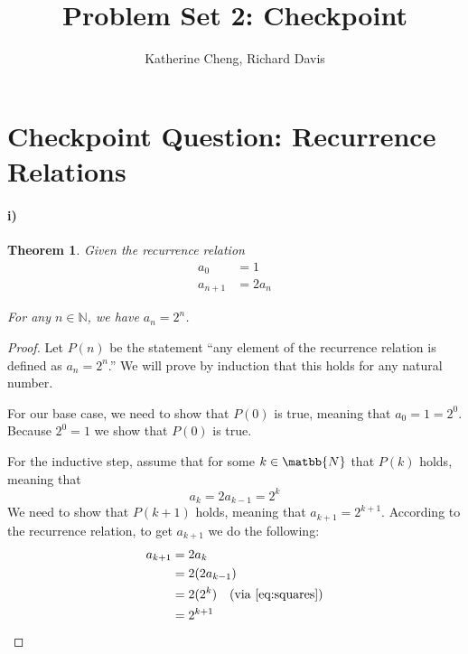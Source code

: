 \documentclass[10pt,letter]{article}
\newtheorem*{thm}{Theorem}
\begin{document}

\title{Problem Set 2: Checkpoint}

\author{Katherine Cheng, Richard Davis}

 
\maketitle 


\section*{Checkpoint Question: Recurrence Relations}

\paragraph{i)} 

\begin{thm}
  Given the recurrence relation
  \begin{align*}
    a_0 &= 1\\
    a_{n+1} &= 2a_n
  \end{align*}

  For any $n \in \mathbb{N}$, we have $a_n = 2^n$.
\end{thm}

\begin{proof}
  Let $P(n)$ be the statement ``any element of the recurrence relation is defined as $a_n = 2^n$.'' We will prove by induction that this holds for any natural number.

  For our base case, we need to show that $P(0)$ is true, meaning that $a_0 = 1 = 2^0$. Because $2^0 = 1$ we show that $P(0)$ is true.

  For the inductive step, assume that for some $k \in \matbb{N}$ that $P(k)$ holds, meaning that
  \begin{equation} \label{eq:squares}
    a_{k} = 2a_{k-1} = 2^k
  \end{equation}
  We need to show that $P(k+1)$ holds, meaning that $a_{k+1} = 2^{k+1}$. According to the recurrence relation, to get $a_{k+1}$ we do the following:
  \begin{align*}
    a_{k+1} &= 2a_k\\
    &= 2(2a_{k-1})\\ 
    &= 2(2^k) \quad (\text{via } \ref{eq:squares})\\
    &= 2^{k+1}
  \end{align*}
\end{proof}
\end{document}
